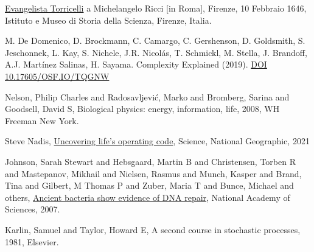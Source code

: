
\cleardoublepage
{}
\begin{thebibliography}{99}

%
%

\href{http://www.imss.fi.it/multi/torricel/le100246.html}{Evangelista Torricelli} a Michelangelo Ricci [in Roma], Firenze, 10 Febbraio 1646,
Istituto e Museo di Storia della Scienza, Firenze, Italia.

M. De Domenico, D. Brockmann, C. Camargo, C. Gershenson, D. Goldsmith, S. Jeschonnek, L. Kay, S. Nichele, J.R. Nicolás, T. Schmickl, M. Stella, J. Brandoff, A.J. Martínez Salinas, H. Sayama. Complexity Explained (2019). \href{https://complexityexplained.github.io/}{DOI 10.17605/OSF.IO/TQGNW}

Nelson, Philip Charles and Radosavljevi{\'c}, Marko and Bromberg, Sarina and Goodsell, David S, Biological physics: energy, information, life, 2008, WH Freeman New York.

Steve Nadis, \href{https://www.nationalgeographic.com/science/article/uncovering-lifes-operating-code}{Uncovering life's operating code}, Science, National Geographic, 2021

Johnson, Sarah Stewart and Hebsgaard, Martin B and Christensen, Torben R and Mastepanov, Mikhail and Nielsen, Rasmus and Munch, Kasper and Brand, Tina and Gilbert, M Thomas P and Zuber, Maria T and Bunce, Michael and others, \href{https://www.pnas.org/doi/10.1073/pnas.0706787104}{Ancient bacteria show evidence of DNA repair}, National Academy of Sciences, 2007.

Karlin, Samuel and Taylor, Howard E, A second course in stochastic processes, 1981, Elsevier.


 
 

\end{thebibliography}
